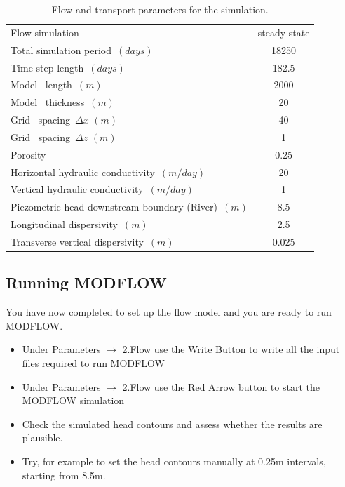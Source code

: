 \begin{table}[t]
\caption{Flow and transport parameters for the simulation.}
\begin{center}
\begin{tabular}{lc} 
\toprule
Flow simulation                     & steady state \\
Total simulation period\ $ (days)      $         &  18250            \\
Time step length\ $ (days)      $         &  182.5            \\
Model \  length\ $ (m)      $         &  2000            \\
Model \  thickness\ $(m)$                        &  20            \\
Grid \ spacing\ $\Delta x $ $(m)$                &    40            \\
Grid \ spacing\ $\Delta z $ $(m)$                &    1            \\
Porosity\     $            $         &  0.25           \\
Horizontal hydraulic conductivity\ $(m/day)$               &  20         \\ 
Vertical   hydraulic conductivity\ $(m/day)$               &  1         \\ 
Piezometric head downstream boundary (River)\ $(m)        $         &  8.5           \\ 
Longitudinal dispersivity\ $(m)         $         &  2.5          \\ 
Transverse  vertical dispersivity\ $(m)         $         &  0.025          \\ 
\bottomrule
\end{tabular}
\label{franken_flow}
\end{center}
\end{table}

\subsection[Running MODFLOW]{Running MODFLOW}

You have now completed to set up the flow model and you are ready to run MODFLOW.

\begin{itemize}

\item Under {\color{blue}Parameters} $\rightarrow$ {\color{blue}2.Flow} use the {\color{blue}Write Button} to write all the input files required to run MODFLOW

\item Under {\color{blue}Parameters} $\rightarrow$ {\color{blue}2.Flow} use the 
{\color{blue}Red Arrow} button to start the MODFLOW simulation

\item Check the simulated head contours and assess whether the results are plausible.

\item Try, for example to set the head contours manually at 0.25m intervals, starting from 8.5m.


\end{itemize}

